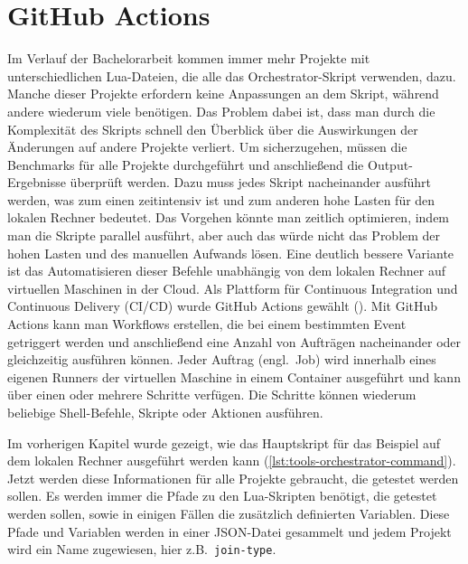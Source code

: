 \section{GitHub Actions}\label{sec:github-actions}

Im Verlauf der Bachelorarbeit kommen immer mehr Projekte mit unterschiedlichen Lua-Dateien, die alle das Orchestrator-Skript verwenden, dazu.
Manche dieser Projekte erfordern keine Anpassungen an dem Skript, während andere wiederum viele benötigen.
Das Problem dabei ist, dass man durch die Komplexität des Skripts schnell den Überblick über die Auswirkungen der Änderungen auf andere Projekte verliert.
Um sicherzugehen, müssen die Benchmarks für alle Projekte durchgeführt und anschließend die Output-Ergebnisse überprüft werden.
Dazu muss jedes Skript nacheinander ausführt werden, was zum einen zeitintensiv ist und zum anderen hohe Lasten für den lokalen Rechner bedeutet.
Das Vorgehen könnte man zeitlich optimieren, indem man die Skripte parallel ausführt, aber auch das würde nicht das Problem der hohen Lasten und des manuellen Aufwands lösen.
Eine deutlich bessere Variante ist das Automatisieren dieser Befehle unabhängig von dem lokalen Rechner auf virtuellen Maschinen in der Cloud.
Als Plattform für Continuous Integration und Continuous Delivery (CI/CD) wurde GitHub Actions gewählt (\cite{github_action_doku}).
Mit GitHub Actions kann man Workflows erstellen, die bei einem bestimmten Event getriggert werden und anschließend eine Anzahl von Aufträgen nacheinander oder gleichzeitig ausführen können.
Jeder Auftrag (engl.\ Job) wird innerhalb eines eigenen Runners der virtuellen Maschine in einem Container ausgeführt und kann über einen oder mehrere Schritte verfügen.
Die Schritte können wiederum beliebige Shell-Befehle, Skripte oder Aktionen ausführen.

Im vorherigen Kapitel wurde gezeigt, wie das Hauptskript für das Beispiel auf dem lokalen Rechner ausgeführt werden kann (\ref{lst:tools-orchestrator-command}).
Jetzt werden diese Informationen für alle Projekte gebraucht, die getestet werden sollen.
Es werden immer die Pfade zu den Lua-Skripten benötigt, die getestet werden sollen, sowie in einigen Fällen die zusätzlich definierten Variablen.
Diese Pfade und Variablen werden in einer JSON-Datei gesammelt und jedem Projekt wird ein Name zugewiesen, hier z.B.\ \texttt{join-type}.

\vspace{-8pt}

\vspace{-5pt}


